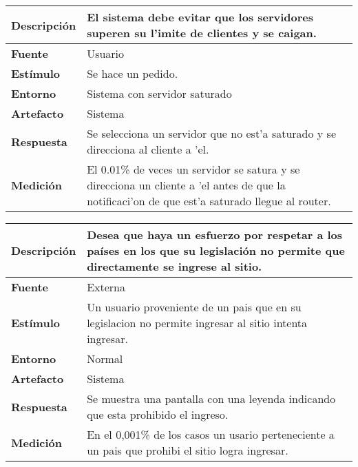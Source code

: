 \begin{center}
  \begin{tabular}{| l | p{10cm} | }
    \hline
  \textbf{Descripción} & El sistema debe evitar que los servidores superen su l'imite de clientes y se caigan.\\  \hline
  \textbf{Fuente} & Usuario\\  \hline
  \textbf{Estímulo} & Se hace un pedido.\\  \hline
  \textbf{Entorno} & Sistema con servidor saturado\\  \hline
  \textbf{Artefacto} & Sistema\\  \hline
  \textbf{Respuesta} & Se selecciona un servidor que no est'a saturado y se direcciona al cliente a 'el.\\  \hline
  \textbf{Medición} & El 0.01\% de veces un servidor se satura y se direcciona un cliente a 'el antes de que la notificaci'on de que est'a saturado llegue al router.\\  \hline
  \end{tabular}
\end{center} 

\begin{center}
  \begin{tabular}{| l | p{10cm} | }
    \hline
  \textbf{Descripción} & Desea que haya un esfuerzo por respetar a los países en los que su legislación no permite que directamente se ingrese al sitio.\\  \hline
  \textbf{Fuente} & Externa\\  \hline
  \textbf{Estímulo} & Un usuario proveniente de un pais que en su legislacion no permite ingresar al sitio intenta ingresar.\\  \hline
  \textbf{Entorno} & Normal\\  \hline
  \textbf{Artefacto} & Sistema\\  \hline
  \textbf{Respuesta} & Se muestra una pantalla con una leyenda indicando que esta prohibido el ingreso.\\  \hline
  \textbf{Medición} & En el 0,001\% de los casos un usario perteneciente a un pais que prohibi el sitio logra ingresar.\\  \hline
  \end{tabular}
\end{center} 


